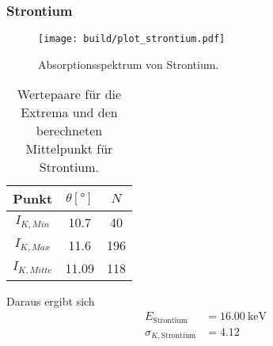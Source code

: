 \clearpage
\subsubsection*{Strontium}
\begin{figure}[H]
    \centering
    \texttt{[image: build/plot\_strontium.pdf]}
    \caption{Absorptionsspektrum von Strontium.}
    \label{fig:strontium}
\end{figure}
\begin{table}[H]                                                                                   
    \centering                                                                                     
        \caption{Wertepaare für die Extrema und den berechneten Mittelpunkt für Strontium.}                      
        \label{tab:Sr}                                                                        
        \begin{tabular}{S S[table-format=2.2] S}                                                   
          \toprule                                                                                 
          {Punkt} & {$\theta [\si{\degree}]$} & {$N$}\\                                            
          \midrule                                                                                 
          {$I_{K,Min  }$} &10.7&40\\
          {$I_{K,Max  }$} &11.6&196\\
          {$I_{K,Mitte}$} &11.09&118\\
          \bottomrule                                                                              
        \end{tabular}                                                                              
      \end{table}                                                                                  
Daraus ergibt sich                                                                                 
\begin{align*}                                                                                     
    E_\text{Strontium} &= \SI{16.00}{\kilo\electronvolt}\\                  
    \sigma_{K, \text{Strontium}} &= \num{4.12}                      
\end{align*}                                                                                       

